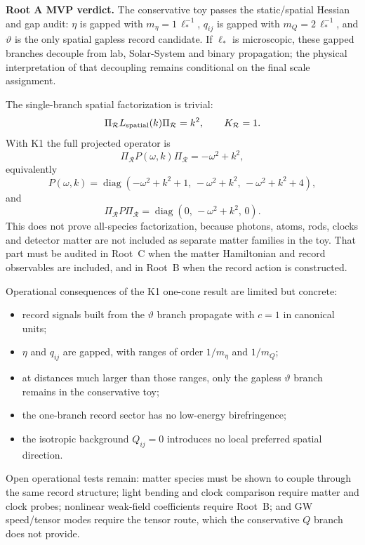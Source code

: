 \documentclass[11pt]{article}
\begin{document}
\medskip\noindent\textbf{Root A MVP verdict.}
The conservative toy passes the static/spatial Hessian and gap audit:
\(\eta\) is gapped with \(m_\eta=1\,\ell_*^{-1}\), \(q_{ij}\) is gapped with
\(m_Q=2\,\ell_*^{-1}\), and \(\vartheta\) is the only spatial gapless record
candidate.  If \(\ell_*\) is microscopic, these gapped branches decouple from
lab, Solar-System and binary propagation; the physical interpretation of that
decoupling remains conditional on the final scale assignment.

The single-branch spatial factorization is trivial:
\[
\Pi_{\mathcal R}L_{\rm spatial}(k)\Pi_{\mathcal R}=k^2,
\qquad K_{\mathcal R}=1.
\]
With K1 the full projected operator is
\[
\boxed{
\Pi_{\mathcal R}P(\omega,k)\Pi_{\mathcal R}=-\omega^2+k^2,
}
\]
equivalently
\[
P(\omega,k)=
\operatorname{diag}(-\omega^2+k^2+1,\,-\omega^2+k^2,\,-\omega^2+k^2+4),
\]
and
\[
\Pi_{\mathcal R}P\Pi_{\mathcal R}
=\operatorname{diag}(0,\,-\omega^2+k^2,\,0).
\]
This does not prove all-species factorization, because photons, atoms, rods,
clocks and detector matter are not included as separate matter families in the
toy.  That part must be audited in Root~C when the matter Hamiltonian and
record observables are included, and in Root~B when the record action is
constructed.

Operational consequences of the K1 one-cone result are limited but concrete:
\begin{itemize}
\item record signals built from the \(\vartheta\) branch propagate with
  \(c=1\) in canonical units;
\item \(\eta\) and \(q_{ij}\) are gapped, with ranges of order \(1/m_\eta\)
  and \(1/m_Q\);
\item at distances much larger than those ranges, only the gapless
  \(\vartheta\) branch remains in the conservative toy;
\item the one-branch record sector has no low-energy birefringence;
\item the isotropic background \(Q_{ij}=0\) introduces no local preferred
  spatial direction.
\end{itemize}
Open operational tests remain: matter species must be shown to couple through
the same record structure; light bending and clock comparison require matter
and clock probes; nonlinear weak-field coefficients require Root~B; and GW
speed/tensor modes require the tensor route, which the conservative \(Q\)
branch does not provide.
\end{document}

